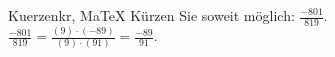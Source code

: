 \begin{MAufgabe}{Kuerzen}{kr, MaTeX}
K\"urzen Sie soweit m\"oglich: $\frac{-801}{819}$.\\ 
\ifLsg\MLoesung
\quad $\frac{-801}{819}=\frac{(9)\cdot(-89)}{(9)\cdot(91)}=\frac{-89}{91}$.\else\relax\fi
 \end{MAufgabe}